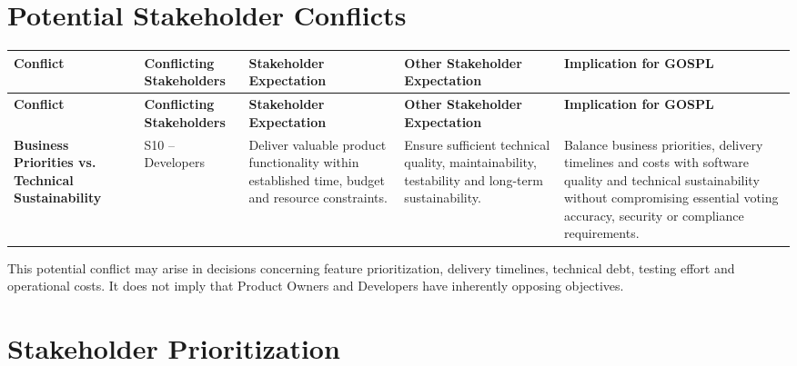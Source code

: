 \documentclass[11pt,a4paper]{article}
\begin{document}

\section*{Potential Stakeholder Conflicts}

\begingroup\small
\begin{longtable}{@{}>{\raggedright\arraybackslash}p{}>{\raggedright\arraybackslash}p{}>{\raggedright\arraybackslash}p{}>{\raggedright\arraybackslash}p{}>{\raggedright\arraybackslash}p{}@{}}
\toprule
\textbf{Conflict} & \textbf{Conflicting Stakeholders} & \textbf{Stakeholder Expectation} & \textbf{Other Stakeholder Expectation} & \textbf{Implication for GOSPL} \\
\midrule
\endfirsthead
\toprule
\textbf{Conflict} & \textbf{Conflicting Stakeholders} & \textbf{Stakeholder Expectation} & \textbf{Other Stakeholder Expectation} & \textbf{Implication for GOSPL} \\
\midrule
\endhead
\bottomrule
\endfoot
\textbf{Business Priorities vs. Technical Sustainability} & S10 -- Developers & Deliver valuable product functionality within established time, budget and resource constraints. & Ensure sufficient technical quality, maintainability, testability and long-term sustainability. & Balance business priorities, delivery timelines and costs with software quality and technical sustainability without compromising essential voting accuracy, security or compliance requirements. \\
\end{longtable}
\endgroup

This potential conflict may arise in decisions concerning feature prioritization, delivery timelines, technical debt, testing effort and operational costs. It does not imply that Product Owners and Developers have inherently opposing objectives.


\section*{Stakeholder Prioritization}
\end{document}
